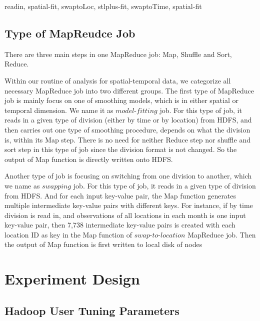 readin, spatial-fit, swaptoLoc, stlplus-fit, swaptoTime, spatial-fit

\subsection{Type of MapReudce Job}

There are three main steps in one MapReduce job: Map, Shuffle and Sort, Reduce.

Within our routine of analysis for spatial-temporal data, we categorize all 
necessary MapReduce job into two different groups. The first type of MapReduce
job is mainly focus on one of smoothing models, which is in either spatial or 
temporal dimension. We name it as $model$-$fitting$ job. For this type of job, it 
reads in a given type of division (either by time or by location) from HDFS, and 
then carries out one type of smoothing procedure, depends on what the division is,
within its Map step. There is no need for neither Reduce step nor shuffle and sort
step in this type of job since the division format is not changed. So the output 
of Map function is directly written onto HDFS.

Another type of job is focusing on switching from one division to another, which
we name as $swapping$ job. For this type of job, it reads in a given type of 
division from HDFS. And for each input key-value pair, the Map function generates
multiple intermediate key-value pairs with different keys. For instance, if by 
time division is read in, and observations of all locations in each month is one 
input key-value pair, then 7,738 intermediate key-value pairs is created with each
location ID as key in the Map function of $swap$-$to$-$location$ MapReduce job.
Then the output of Map function is first written to local disk of nodes 

\section{Experiment Design}

\subsection{Hadoop User Tuning Parameters}

